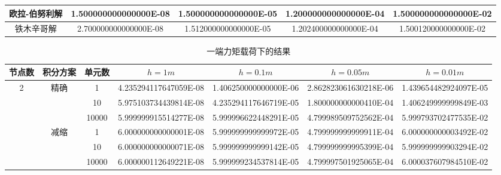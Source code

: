 \documentclass[UTF8,c5size]{ctexart}
\begin{document}
\begin{table*}[htbp]
\begin{center}
\begin{tabular}{|c|c|c|c|c|c|c|}
            \multicolumn{3}{|c|}{欧拉-伯努利解}
            &1.500000000000000E-08&1.500000000000000E-05&1.200000000000000E-04&1.500000000000000E-02\\
            \hline
            \multicolumn{3}{|c|}{铁木辛哥解}
            &2.700000000000000E-08&1.512000000000000E-05&1.202400000000000E-04&1.500120000000000E-02\\
            \hline
    
        \end{tabular}
    \end{center}
\end{table*}

\begin{table*}[htbp]
    \footnotesize
    \begin{center}
        
        \caption{一端力矩载荷下的结果}
        \label{表2}
        \begin{tabular}{|c|c|c|c|c|c|c|}
            \hline
            节点数&积分方案&单元数&$h=1m$&$h=0.1m$&$h=0.05m$&$h=0.01m$\\
            \hline
            \multirow{6}{*}{2}&\multirow{3}{*}{精确}&
            1&4.235294117647059E-08&1.406250000000000E-06&2.862823061630218E-06&1.439654482924097E-05\\
            \cline{3-7}
            &&
            10&5.975103734439814E-08&4.235294117646719E-05&1.800000000000410E-04&1.406249999999849E-03\\
            \cline{3-7}
            &&
            10000&5.999999915514277E-08&5.999996622448291E-05&4.799989509752562E-04&5.999793702477535E-02\\
            \cline{2-7}
            &\multirow{3}{*}{减缩}&
            1&6.000000000000001E-08&5.999999999999972E-05&4.799999999999911E-04&6.000000000003492E-02\\
            \cline{3-7}
            &&
            10&6.000000000000071E-08&5.999999999999142E-05&4.799999999995399E-04&5.999999999903294E-02\\
            \cline{3-7}
            &&
            10000&6.000000112649221E-08&5.999999234537814E-05&4.799997501925065E-04&6.000037607984510E-02\\
            \hline
    

\end{tabular}
\end{center}
\end{table*}
\end{document}
